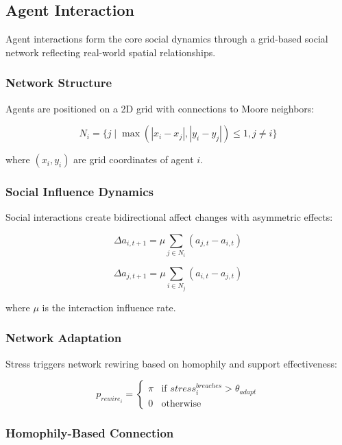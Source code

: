 \documentclass[
  letterpaper,
  DIV=11,
  numbers=noendperiod]{scrartcl}
\begin{document}
\subsection{Agent Interaction}\label{agent-interaction}

Agent interactions form the core social dynamics through a grid-based
social network reflecting real-world spatial relationships.

\subsubsection{Network Structure}\label{network-structure}

Agents are positioned on a 2D grid with connections to Moore neighbors:

\[N_i = \{j \mid \max(|x_i - x_j|, |y_i - y_j|) \leq 1, j \neq i\}\]

where \((x_i, y_i)\) are grid coordinates of agent \(i\).

\subsubsection{Social Influence
Dynamics}\label{social-influence-dynamics}

Social interactions create bidirectional affect changes with asymmetric
effects:

\[\Delta a_{i,t+1} = \mu \sum_{j \in N_i} (a_{j,t} - a_{i,t})\]

\[\Delta a_{j,t+1} = \mu \sum_{i \in N_j} (a_{i,t} - a_{j,t})\]

where \(\mu\) is the interaction influence rate.

\subsubsection{Network Adaptation}\label{network-adaptation}

Stress triggers network rewiring based on homophily and support
effectiveness:

\[p_{rewire_i} = \begin{cases}
\pi & \text{if } stress_i^{breaches} > \theta_{adapt} \\ 0 & \text{otherwise} \end{cases}\]

\subsubsection{Homophily-Based
Connection}\label{homophily-based-connection}
\end{document}
